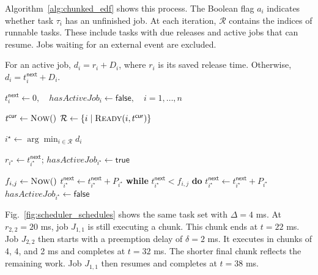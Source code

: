 \documentclass[conference]{IEEEtran}
\begin{document}
Algorithm~\ref{alg:chunked_edf} shows this process. The Boolean flag $a_i$ indicates whether task $\tau_i$ has an unfinished job. At each iteration, $\mathcal{R}$ contains the indices of runnable tasks. These include tasks with due releases and active jobs that can resume. Jobs waiting for an external event are excluded.

For an active job, $d_i=r_i+D_i$, where $r_i$ is its saved release time. Otherwise, $d_i=t_i^{\mathsf{next}}+D_i$.

%
\begin{algorithm}[!t]
	\caption{Chunked EDF Scheduler}
	\label{alg:chunked_edf}
	\begin{algorithmic}[1]
		\State $t_i^{\mathsf{next}}\gets 0,\quad
		\mathit{hasActiveJob}_i\gets\mathsf{false},\quad i=1,\ldots,n$
		
		\State $t^{\mathsf{cur}}\gets\textproc{Now}()$
		\State $\mathcal{R}\gets
		\{i\mid\Call{Ready}{i,t^{\mathsf{cur}}}\}$
		
		\State $i^\star\gets
		\arg\min_{i\in\mathcal{R}}d_i$
		
		\State $r_{i^\star}\gets t_{i^\star}^{\mathsf{next}}$;
		\State $\mathit{hasActiveJob}_{i^\star}\gets\mathsf{true}$
		\EndIf
		
		\State {}
		
		\State $f_{i,j}\gets\textproc{Now}()$
		\State $t_{i^\star}^{\mathsf{next}}
		\gets t_{i^\star}^{\mathsf{next}}
		+P_{i^\star}$
		\State \textbf{while}
		$t_{i^\star}^{\mathsf{next}}<f_{i,j}$
		\textbf{do}
		$t_{i^\star}^{\mathsf{next}}
		\gets t_{i^\star}^{\mathsf{next}}
		+P_{i^\star}$
		\State $\mathit{hasActiveJob}_{i^\star}\gets\mathsf{false}$
		\EndIf
		\EndIf
		\EndWhile
		\EndFunction
	\end{algorithmic}
\end{algorithm}

Fig.~\ref{fig:scheduler_schedules} shows the same task set with $\Delta=4$ ms. At $r_{2,2}=20$ ms, job $J_{1,1}$ is still executing a chunk. This chunk ends at $t=22$ ms. Job $J_{2,2}$ then starts with a preemption delay of $\delta=2$ ms. It executes in chunks of 4, 4, and 2 ms and completes at $t=32$ ms. The shorter final chunk reflects the remaining work. Job $J_{1,1}$ then resumes and completes at $t=38$ ms.
\end{document}

